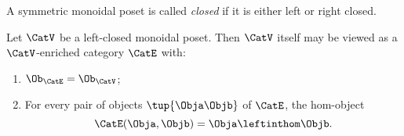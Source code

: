 \begin{ctdefinition}
A symmetric monoidal poset is called \emph{closed} if it is either left or right closed. 
\end{ctdefinition}


\begin{lemma}
Let $\CatV$ be a left-closed monoidal poset. Then $\CatV$ itself may be viewed as a $\CatV$-enriched category $\CatE$ with:
\begin{enumerate}
\item $\Ob_\CatE = \Ob_\CatV$;
\item For every pair of objects $\tup{\Obja \Objb}$ of $\CatE$, the hom-object
\begin{equation}
\CatE(\Obja, \Objb) = \Obja \leftinthom \Objb.
\end{equation}
\end{enumerate}
\end{lemma}

